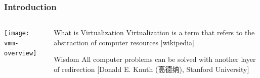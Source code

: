 \iffalse
%
%
\begin{frame}[plain]
	\frametitle{Introduction}
	
	
	
	\begin{columns}
		
		\begin{column}{.4\textwidth}
			
			\texttt{[image: vmm-overview]}
			
		\end{column}
		
		\begin{column}{.6\textwidth}
			
		
			\begin{block}{What is Virtualization}
				Virtualization is a term that refers to the abstraction of computer resources [wikipedia]
			\end{block}
		
			\begin{block}{Wisdom}
				All computer problems can be solved with another layer of redirection [Donald E. Knuth (高德纳), Stanford University]
			\end{block}

		\end{column}
		
		
	\end{columns}
	
	
\end{frame}

